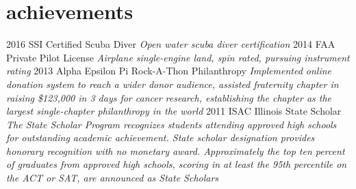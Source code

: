 \documentclass[print]{gunn-resume}
\begin{document}
\section{achievements}

\begin{entrylist}
\entry
    {2016}
    {SSI Certified Scuba Diver}
    {}
    {\emph{Open water scuba diver certification}
    }
  \entry
    {2014}
    {FAA Private Pilot License}
    {}
    {\emph{Airplane single-engine land, spin rated, pursuing instrument rating}}
  \entry
    {2013}
    {Alpha Epsilon Pi Rock-A-Thon Philanthropy}
    {}
    {\emph{Implemented online donation system to reach a wider donor audience, assisted  fraternity chapter in raising \$123,000 in 3 days for cancer research, establishing the chapter as the largest single-chapter philanthropy in the world}}
    \entry
    {2011}
    {ISAC Illinois State Scholar}
    {}
    {\emph{The State Scholar Program recognizes students attending approved high schools for outstanding academic achievement. State scholar designation provides honorary recognition with no monetary award. Approximately the top ten percent of graduates from approved high schools, scoring in at least the 95th percentile on the ACT or SAT, are announced as State Scholars}}
\end{entrylist}
\end{document}
